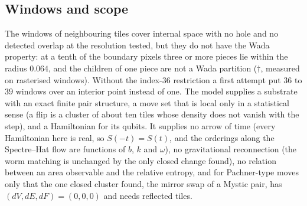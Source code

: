 \documentclass[11pt]{article}
\theoremstyle{definition}
\begin{document}
\subsection{Windows and scope}
The windows of neighbouring tiles cover internal space with no hole and no detected overlap at the resolution tested, but they do not have the Wada property: at a tenth of the boundary pixels three or more pieces lie within the radius $0.064$, and the children of one piece are not a Wada partition ($\dagger$, measured on rasterised windows). Without the index-$36$ restriction a first attempt put $36$ to $39$ windows over an interior point instead of one. The model supplies a substrate with an exact finite pair structure, a move set that is local only in a statistical sense (a flip is a cluster of about ten tiles whose density does not vanish with the step), and a Hamiltonian for its qubits. It supplies no arrow of time (every Hamiltonian here is real, so $S(-t)=S(t)$, and the orderings along the Spectre--Hat flow are functions of $b$, $k$ and $\omega$), no gravitational reconnection (the worm matching is unchanged by the only closed change found), no relation between an area observable and the relative entropy, and for Pachner-type moves only that the one closed cluster found, the mirror swap of a Mystic pair, has $(dV,dE,dF)=(0,0,0)$ and needs reflected tiles.




\end{document}
